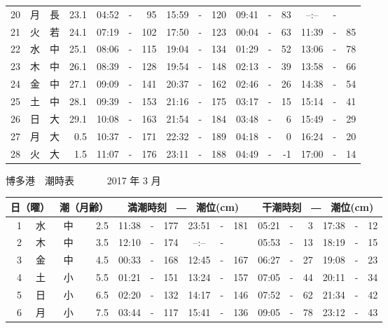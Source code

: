 \documentclass[12pt.a4j]{jsarticle}
\begin{document}
\begin{center}
\begin{table}[ht]
\begin{tabular}{|rc|cr|ccrccr|ccrccr|}
20 & 月 & 長 & 23.1 &  04:52 &-&  95  &  15:59 &-& 120  &   09:41 &-&  83  &   --:-- &-&     \\
21 & 火 & 若 & 24.1 &  07:19 &-& 102  &  17:50 &-& 123  &   00:04 &-&  63  &   11:39 &-&  85  \\
22 & 水 & 中 & 25.1 &  08:06 &-& 115  &  19:04 &-& 134  &   01:29 &-&  52  &   13:06 &-&  78  \\
23 & 木 & 中 & 26.1 &  08:39 &-& 128  &  19:54 &-& 148  &   02:13 &-&  39  &   13:58 &-&  66  \\
24 & 金 & 中 & 27.1 &  09:09 &-& 141  &  20:37 &-& 162  &   02:46 &-&  26  &   14:38 &-&  54  \\
25 & 土 & 中 & 28.1 &  09:39 &-& 153  &  21:16 &-& 175  &   03:17 &-&  15  &   15:14 &-&  41  \\
26 & 日 & 大 & 29.1 &  10:08 &-& 163  &  21:54 &-& 184  &   03:48 &-&   6  &   15:49 &-&  29  \\
27 & 月 & 大 &  0.5 &  10:37 &-& 171  &  22:32 &-& 189  &   04:18 &-&   0  &   16:24 &-&  20  \\
28 & 火 & 大 &  1.5 &  11:07 &-& 176  &  23:11 &-& 188  &   04:49 &-&  -1  &   17:00 &-&  14  \\
   \hline
   \end{tabular}
\end{table}
\newpage
 {\LARGE 博多港　潮時表　　　}
 {\large 2017 年  3 月}\\
 \begin{table}[ht]
    \begin{tabular}{|rc|cr|ccrccr|ccrccr|}
    \hline
    \multicolumn{2}{|c|}{日（曜）} & \multicolumn{2}{c|}{潮（月齢）} & \multicolumn{6}{c|}{満潮時刻　―　潮位(cm)} & \multicolumn{6}{c|}{干潮時刻　―　潮位(cm)} \\
 \hline
 1 & 水 & 中 &  2.5 &  11:38 &-& 177  &  23:51 &-& 181  &   05:21 &-&   3  &   17:38 &-&  12  \\
 2 & 木 & 中 &  3.5 &  12:10 &-& 174  &  --:-- &-&     &   05:53 &-&  13  &   18:19 &-&  15  \\
 3 & 金 & 中 &  4.5 &  00:33 &-& 168  &  12:45 &-& 167  &   06:27 &-&  27  &   19:08 &-&  23  \\
 4 & 土 & 小 &  5.5 &  01:21 &-& 151  &  13:24 &-& 157  &   07:05 &-&  44  &   20:11 &-&  34  \\
 5 & 日 & 小 &  6.5 &  02:20 &-& 132  &  14:17 &-& 146  &   07:52 &-&  62  &   21:34 &-&  42  \\
 6 & 月 & 小 &  7.5 &  03:44 &-& 117  &  15:41 &-& 136  &   09:05 &-&  78  &   23:12 &-&  43  \\

\end{tabular}
\end{table}
\end{center}
\end{document}
